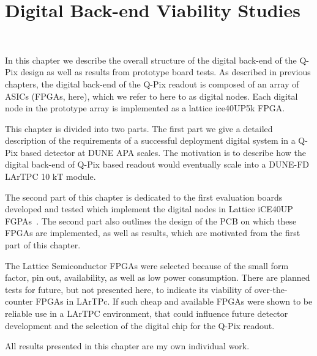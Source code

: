 \chapter{Digital Back-end Viability Studies}~\label{chap:qdb}

In this chapter we describe the overall structure of the digital back-end of the Q-Pix design as well as results from prototype board tests.
As described in previous chapters, the digital back-end of the Q-Pix readout is composed of an array of ASICs (FPGAs, here), which we refer to here to as digital nodes.
Each digital node in the prototype array is implemented as a lattice ice40UP5k FPGA.

This chapter is divided into two parts.
The first part we give a detailed description of the requirements of a successful deployment digital system in a Q-Pix based detector at DUNE APA scales.
The motivation is to describe how the digital back-end of Q-Pix based readout would eventually scale into a DUNE-FD LArTPC 10 kT module.

The second part of this chapter is dedicated to the first evaluation boards developed and tested which implement the digital nodes in Lattice iCE40UP FGPAs~\citep{lattice_ice40up_datasheet}.
The second part also outlines the design of the PCB on which these FPGAs are implemented, as well as results, which are motivated from the first part of this chapter.

The Lattice Semiconductor FPGAs \citep{lattice_ice40up_datasheet} were selected because of the small form factor, pin out, availability, as well as low power consumption.
There are planned tests for future, but not presented here, to indicate its viability of over-the-counter FPGAs in LArTPc.
If such cheap and available FPGAs were shown to be reliable use in a LArTPC environment, that could influence future detector development and the selection of the digital chip for the Q-Pix readout.

All results presented in this chapter are my own individual work.



